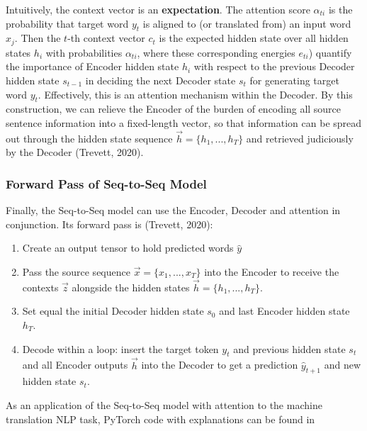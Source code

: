 Intuitively, the context vector is an \textbf{expectation}. The attention score $\alpha_{ti}$ is the probability that target word $y_t$ is aligned to (or translated from) an input word $x_j$. Then the $t$-th context vector $c_t$ is the expected hidden state over all hidden states $h_i$ with probabilities $\alpha_{ti}$, where these corresponding energies $e_{ti}$) quantify the importance of Encoder hidden state $h_i$ with respect to the previous Decoder hidden state $s_{t-1}$ in deciding the next Decoder state $s_t$ for generating target word $y_t$. 
\newline Effectively, this is an attention mechanism within the Decoder. By this construction, we can relieve the Encoder of the burden of encoding all source sentence information into a fixed-length vector, so that information can be spread out through the hidden state sequence $\overrightarrow{h} = \Big \{ h_1,...,h_T\Big \}$ and retrieved judiciously by the Decoder (Trevett, 2020). 



\subsubsection{Forward Pass of Seq-to-Seq Model}

Finally, the Seq-to-Seq model can use the Encoder, Decoder and attention in conjunction. Its forward pass is (Trevett, 2020): 
\begin{enumerate}
    \item Create an output tensor to hold predicted words $\hat{y}$
    
    \item Pass the source sequence $\overrightarrow{x} = \Big \{ x_1, ..., x_T \Big \}$ into the Encoder to receive the contexts $\overrightarrow{z}$ alongside the hidden states $\overrightarrow{h} = \Big \{ h_1, ..., h_T \Big \}$.
    
    \item Set equal the initial Decoder hidden state $s_0$ and last Encoder hidden state $h_T$.
    
    \item Decode within a loop: insert the target token $y_t$ and previous hidden state $s_t$ and all Encoder outputs $\overrightarrow{h}$ into the Decoder to get a prediction $\hat{y}_{t+1}$ and new hidden state $s_t$.
    
    
\end{enumerate}

As an application of the Seq-to-Seq model with attention to the machine translation NLP task, PyTorch code with explanations can be found in 
